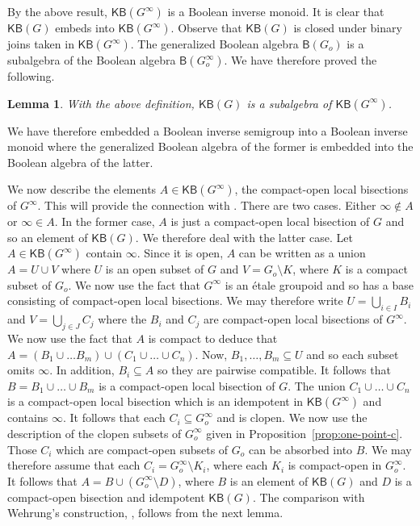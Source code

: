 \documentclass[a4paper]{amsart}
\newtheorem{lemma}[theorem]{Lemma}
\begin{document}
By the above result, $\mathsf{KB}(G^{\infty})$ is a Boolean inverse monoid.
It is clear that $\mathsf{KB}(G)$ embeds into $\mathsf{KB}(G^{\infty})$.
Observe that $\mathsf{KB}(G)$ is closed under binary joins taken in $\mathsf{KB}(G^{\infty})$.
The generalized Boolean algebra $\mathsf{B}(G_{o})$ is a subalgebra of the Boolean algebra $\mathsf{B}(G_{o}^{\infty})$.
We have therefore proved the following.

\begin{lemma}\label{lem:subalgebra} With the above definition,
$\mathsf{KB}(G)$ is a subalgebra of  $\mathsf{KB}(G^{\infty})$.
\end{lemma}

We have therefore embedded a Boolean inverse semigroup into a Boolean inverse monoid
where the generalized Boolean algebra of the former is embedded into the Boolean algebra of the latter.

We now describe the elements $A \in \mathsf{KB}(G^{\infty})$, the compact-open local bisections of $G^{\infty}$.
This will provide the connection with \cite[Definition 6.6.1]{W}.
There are two cases.
Either $\infty \notin A$ or $\infty \in A$.
In the former case, $A$ is just a compact-open local bisection of $G$
and so an element of $\mathsf{KB}(G)$.
We therefore deal with the latter case.
Let $A \in \mathsf{KB}(G^{\infty})$ contain $\infty$.
Since it is open, $A$ can be written as a union $A = U \cup V$ where $U$ is an open subset of $G$
and $V = G_{o} \setminus K$, where $K$ is a compact subset of $G_{o}$.
We now use the fact that $G^{\infty}$ is an \'etale groupoid and so has a base consisting of compact-open local bisections.
We may therefore write $U = \bigcup_{i \in I} B_{i}$ and $V = \bigcup_{j \in J} C_{j}$
where the $B_{i}$ and $C_{j}$ are compact-open local bisections of $G^{\infty}$.
We now use the fact that $A$ is compact to deduce that 
$A = (B_{1} \cup \ldots B_{m}) \cup (C_{1} \cup \ldots \cup C_{n})$.
Now, $B_{1}, \ldots, B_{m} \subseteq U$ and so each subset omits $\infty$.
In addition, $B_{i} \subseteq A$ so they are pairwise compatible.
It follows that $B = B_{1} \cup \ldots \cup B_{m}$ is a compact-open local bisection of $G$.
The union $C_{1} \cup \ldots \cup C_{n}$ is a compact-open local bisection which is an idempotent in $\mathsf{KB}(G^{\infty})$
and contains $\infty$.
It follows that each $C_{i} \subseteq G_{o}^{\infty}$ and is clopen.
We now use the description of the clopen subsets of $G_{o}^{\infty}$ given in Proposition~\ref{prop:one-point-c}.
Those $C_{i}$ which are compact-open subsets of $G_{o}$ can be absorbed into $B$.
We may therefore assume that each $C_{i} = G_{o}^{\infty} \setminus K_{i}$, where each $K_{i}$ is compact-open in $G_{o}^{\infty}$.
It follows that $A = B \cup (G_{o}^{\infty} \setminus D)$, where $B$ is an element of $\mathsf{KB}(G)$
and $D$ is a compact-open bisection and idempotent $\mathsf{KB}(G)$.
The comparison with Wehrung's construction, \cite[Definition 6.6.1]{W}, 
follows from the next lemma.
\end{document}
